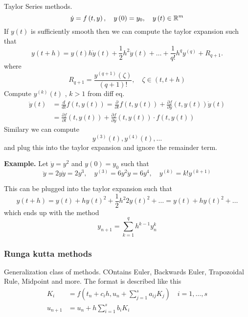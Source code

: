\documentclass{article}
\theoremstyle{remark}
\newcommand{\newpara}
  {
  \vskip 0.4cm
  }
\begin{document}
Taylor Series methods. \[
\dot{y} = f\left( t, y \right) , \quad  y\left( 0 \right) = y_{0} , \quad  y\left( t \right) \in  \mathbb{R} ^{m}  \\
\]  
If $y\left( t \right)  $ is sufficiently smooth then we can compute the taylor expansion such that \[
y \left( t+ h \right) = y\left( t \right) h \dot{y} \left( t \right) + \frac{1}{2} h^2 \ddot{y}\left( t \right) + \ldots + \frac{1}{q!} h^{q} y^{(q)} + R_{q+1}  .
\] 
where \[
R_{q+1} = \frac{y^{(q+1) }\left( \zeta  \right)}{ \left( q +1 \right) !}  , \quad  \zeta  \in  \left( t, t+h \right) 
\] 
Compute $y ^{(k)} \left( t \right)$ , $k>1$ from diff eq. \[
  \begin{split}
\ddot{y} \left( t \right)  & = \frac{d }{dt } f\left( t, y\left( t \right) \right) = \frac{\partial }{\partial t} f \left( t, y\left( t \right) \right) + \frac{\partial f}{\partial y}  \left( t, y\left( t \right)   \right) \dot{y}\left( t \right)  \\
 & = \frac{\partial f}{\partial t}  \left( t, y\left( t \right) \right) +\frac{\partial f}{\partial y} \left( t, y\left( t \right) \right) \cdot f\left( t, y\left( t \right) \right)
  \end{split} 
\] 
Similary we can compute \[
y^{(3)}\left( t \right) , y^{(4) }\left( t \right) , \ldots
\]  
and plug this into the taylor expansion and ignore the remainder term. 

\newpara
\textbf{Example.} 
Let $\dot{y} = y^2$ and $y\left( 0 \right) = y_{0}$ such that \[
\ddot{y} = 2y \dot{y} = 2y^3, \quad y^{(3) } = 6 y^2\dot{y} = 6y^{4} , \quad y^{(k)} = k! y^{(k+1)}  
\] 

This can be plugged into the taylor expansion such that \[
y\left( t + h \right) = y\left( t \right) + h y\left( t \right)^2 + \frac{1}{2} h^2 2 y\left( t \right)^2 + \ldots = y\left( t \right) + hy\left( t \right)^2 + \ldots
\]  
which ends up with the method \[
y_{n+1} = \sum_{k=1}^{ q}  h^{k-1} y ^{k}_{n}
\] 

\subsubsection{Runga kutta methods}%
\label{ssub:runga_kutta_methods}

Generalization class of methods. COntains Euler, Backwards Euler, Trapozoidal Rule, Midpoint and more. The format is described like this \[
  \begin{split}
K_{i}  & = f\left( t _{n} + c_{i}h, u_{n} + \sum_{j=1}^{s} a_{ij} K_{j}  \right) \quad  i =  1, \ldots, s  \\
u_{n+1}  & = u_{n} + h \sum_{i=1}^{s}  b_{i} K_{i}
  \end{split} 
\] 
\end{document}
